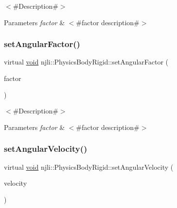 $<$\#\+Description\#$>$


\begin{DoxyParams}{Parameters}
{\em factor} & $<$\#factor description\#$>$ \\
\hline
\end{DoxyParams}
\mbox{\label{classnjli_1_1_physics_body_rigid_a20c0ae6e0bc489646c4d3206fdda2662}} 
\subsubsection{\texorpdfstring{set\+Angular\+Factor()}{setAngularFactor()}\hspace{0.1cm}{\footnotesize\ttfamily [2/2]}}
{\footnotesize\ttfamily virtual \mbox{\hyperlink{_thread_8h_af1e856da2e658414cb2456cb6f7ebc66}{void}} njli\+::\+Physics\+Body\+Rigid\+::set\+Angular\+Factor (\begin{DoxyParamCaption}\item[{\mbox{\hyperlink{_util_8h_a5f6906312a689f27d70e9d086649d3fd}{f32}}}]{factor }\end{DoxyParamCaption})\hspace{0.3cm}{\ttfamily [virtual]}}

$<$\#\+Description\#$>$


\begin{DoxyParams}{Parameters}
{\em factor} & $<$\#factor description\#$>$ \\
\hline
\end{DoxyParams}
\mbox{\label{classnjli_1_1_physics_body_rigid_ab6e5a5e5d9ee063013bb04502508d9ab}} 
\subsubsection{\texorpdfstring{set\+Angular\+Velocity()}{setAngularVelocity()}}
{\footnotesize\ttfamily virtual \mbox{\hyperlink{_thread_8h_af1e856da2e658414cb2456cb6f7ebc66}{void}} njli\+::\+Physics\+Body\+Rigid\+::set\+Angular\+Velocity (\begin{DoxyParamCaption}\item[{const bt\+Vector3 \&}]{velocity }\end{DoxyParamCaption})\hspace{0.3cm}{\ttfamily [virtual]}}

